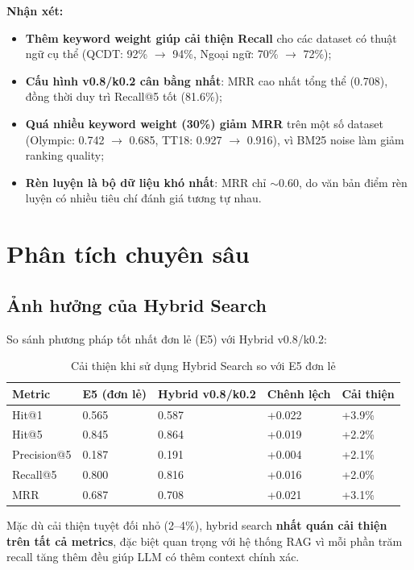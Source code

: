\documentclass[../DoAn.tex]{subfiles}
\begin{document}
\textbf{Nhận xét:}
\begin{itemize}
    \item \textbf{Thêm keyword weight giúp cải thiện Recall} cho các dataset có thuật ngữ cụ thể (QCDT: 92\% $\rightarrow$ 94\%, Ngoại ngữ: 70\% $\rightarrow$ 72\%);
    \item \textbf{Cấu hình v0.8/k0.2 cân bằng nhất}: MRR cao nhất tổng thể (0.708), đồng thời duy trì Recall@5 tốt (81.6\%);
    \item \textbf{Quá nhiều keyword weight (30\%) giảm MRR} trên một số dataset (Olympic: 0.742 $\rightarrow$ 0.685, TT18: 0.927 $\rightarrow$ 0.916), vì BM25 noise làm giảm ranking quality;
    \item \textbf{Rèn luyện là bộ dữ liệu khó nhất}: MRR chỉ $\sim$0.60, do văn bản điểm rèn luyện có nhiều tiêu chí đánh giá tương tự nhau.
\end{itemize}

\section{Phân tích chuyên sâu}

\subsection{Ảnh hưởng của Hybrid Search}

So sánh phương pháp tốt nhất đơn lẻ (E5) với Hybrid v0.8/k0.2:

\begin{table}[H]
\centering
\begin{tabular}{|l|l|l|l|l|}
\hline
\textbf{Metric} & \textbf{E5 (đơn lẻ)} & \textbf{Hybrid v0.8/k0.2} & \textbf{Chênh lệch} & \textbf{Cải thiện} \\
\hline
Hit@1 & 0.565 & 0.587 & +0.022 & +3.9\% \\
\hline
Hit@5 & 0.845 & 0.864 & +0.019 & +2.2\% \\
\hline
Precision@5 & 0.187 & 0.191 & +0.004 & +2.1\% \\
\hline
Recall@5 & 0.800 & 0.816 & +0.016 & +2.0\% \\
\hline
MRR & 0.687 & 0.708 & +0.021 & +3.1\% \\
\hline
\end{tabular}
\caption{Cải thiện khi sử dụng Hybrid Search so với E5 đơn lẻ}
\end{table}

Mặc dù cải thiện tuyệt đối nhỏ (2--4\%), hybrid search \textbf{nhất quán cải thiện trên tất cả metrics}, đặc biệt quan trọng với hệ thống RAG vì mỗi phần trăm recall tăng thêm đều giúp LLM có thêm context chính xác.
\end{document}
